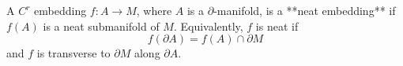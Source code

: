 A $C^r$ embedding $f: A \to M$, where $A$ is a $\partial$-manifold, is a **neat embedding** if $f(A)$ is a neat submanifold of $M$. Equivalently, $f$ is neat if
$$f(\partial A) = f(A) \cap \partial M$$
and $f$ is transverse to $\partial M$ along $\partial A$.
